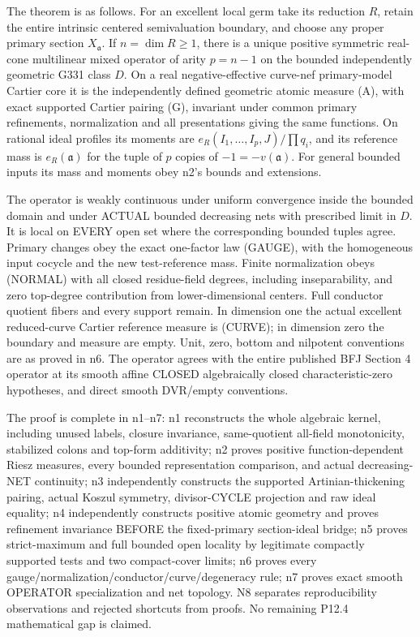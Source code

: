 \documentclass[11pt]{article}
\begin{document}
The theorem is as follows. For an excellent local germ take its reduction \(R\), retain the entire intrinsic centered semivaluation boundary, and choose any proper primary section \(X_{\mathfrak a}\). If \(n=\dim R\ge1\), there is a unique positive symmetric real-cone multilinear mixed operator of arity \(p=n-1\) on the bounded independently geometric G331 class \(D\). On a real negative-effective curve-nef primary-model Cartier core it is the independently defined geometric atomic measure (A), with exact supported Cartier pairing (G), invariant under common primary refinements, normalization and all presentations giving the same functions. On rational ideal profiles its moments are \(e_R(I_1,\ldots,I_p,J)/\prod q_i\), and its reference mass is \(e_R(\mathfrak a)\) for the tuple of \(p\) copies of \(-1=-v(\mathfrak a)\). For general bounded inputs its mass and moments obey n2's bounds and extensions.

The operator is weakly continuous under uniform convergence inside the bounded domain and under ACTUAL bounded decreasing nets with prescribed limit in \(D\). It is local on EVERY open set where the corresponding bounded tuples agree. Primary changes obey the exact one-factor law (GAUGE), with the homogeneous input cocycle and the new test-reference mass. Finite normalization obeys (NORMAL) with all closed residue-field degrees, including inseparability, and zero top-degree contribution from lower-dimensional centers. Full conductor quotient fibers and every support remain. In dimension one the actual excellent reduced-curve Cartier reference measure is (CURVE); in dimension zero the boundary and measure are empty. Unit, zero, bottom and nilpotent conventions are as proved in n6. The operator agrees with the entire published BFJ Section 4 operator at its smooth affine CLOSED algebraically closed characteristic-zero hypotheses, and direct smooth DVR/empty conventions.

The proof is complete in n1--n7: n1 reconstructs the whole algebraic kernel, including unused labels, closure invariance, same-quotient all-field monotonicity, stabilized colons and top-form additivity; n2 proves positive function-dependent Riesz measures, every bounded representation comparison, and actual decreasing-NET continuity; n3 independently constructs the supported Artinian-thickening pairing, actual Koszul symmetry, divisor-CYCLE projection and raw ideal equality; n4 independently constructs positive atomic geometry and proves refinement invariance BEFORE the fixed-primary section-ideal bridge; n5 proves strict-maximum and full bounded open locality by legitimate compactly supported tests and two compact-cover limits; n6 proves every gauge/normalization/conductor/curve/degeneracy rule; n7 proves exact smooth OPERATOR specialization and net topology. N8 separates reproducibility observations and rejected shortcuts from proofs. No remaining P12.4 mathematical gap is claimed.
\end{document}
